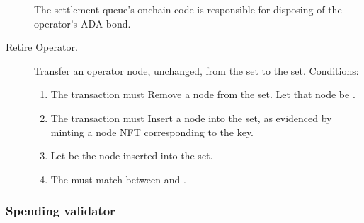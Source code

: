 \documentclass[../midgard.tex]{subfiles}
\begin{document}
\begin{description}
        The settlement queue's onchain code is responsible for disposing of the operator's ADA bond.
    \item[Retire Operator.] Transfer an operator node, unchanged, from the  set to the  set.
      Conditions:
        \begin{enumerate}
            \item The transaction must Remove a node from the  set.
              Let that node be .
            \item The transaction must Insert a node into the  set, as evidenced by minting a  node NFT corresponding to the  key.
            \item Let  be the node inserted into the  set.
            \item The  must match between  and .
        \end{enumerate}
\end{description}

\subsubsection{Spending validator}
\label{h:active-operators-spending-validator}
\end{document}
